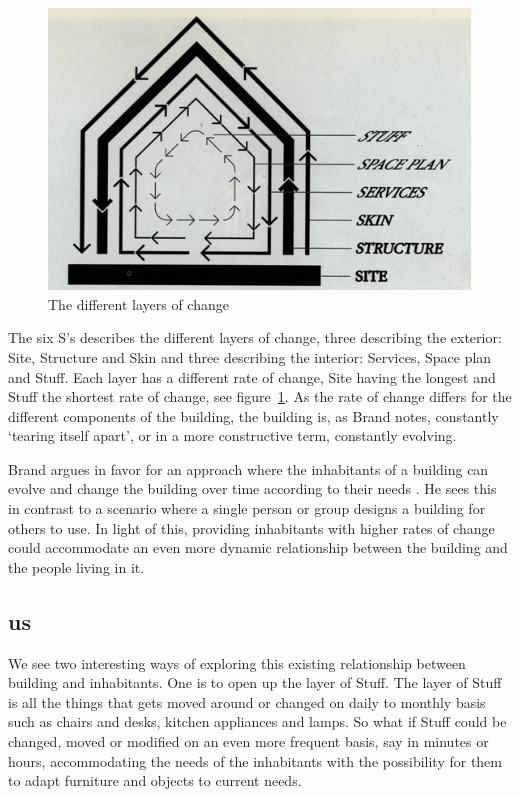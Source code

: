 \begin{figure}[h]
	\centering
  		\includegraphics[width=.9\textwidth]{figures/brand-diagram}
	\caption{The different layers of change \citep[chapter 2]{brand1995buildings}}
   \label{brand-diagram}
\end{figure}

The six S's describes the different layers of change, three describing the exterior: Site, Structure and Skin and three describing the interior: Services, Space plan and Stuff.
Each layer has a different rate of change, Site having the longest and Stuff the shortest rate of change, see figure~\ref{brand-diagram}.
As the rate of change differs for the different components of the building, the building is, as Brand notes, constantly `tearing itself apart', or in a more constructive term, constantly evolving.

Brand argues in favor for an approach where the inhabitants of a building can evolve and change the building over time according to their needs \citep{brandBBCvideo}.
He sees this in contrast to a scenario where a single person or group designs a building for others to use.
In light of this, providing inhabitants with higher rates of change could accommodate an even more dynamic relationship between the building and the people living in it.

\subsection{us}

We see two interesting ways of exploring this existing relationship between building and inhabitants.
One is to open up the layer of Stuff.
The layer of Stuff is all the things that gets moved around or changed on daily to monthly basis such as chairs and desks, kitchen appliances and lamps.
So what if Stuff could be changed, moved or modified on an even more frequent basis, say in minutes or hours, accommodating the needs of the inhabitants with the possibility for them to adapt furniture and objects to current needs.

